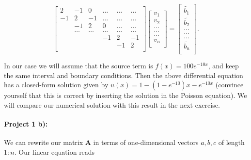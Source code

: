 \documentclass[%
oneside,                 %
final,                   %
10pt]{article}
\begin{document}
\[
     \begin{bmatrix}
                           2& -1 & 0 &\dots   & \dots &\dots \\
                           -1 & 2 & -1 &\dots &\dots &\dots \\
                           & -1 & 2 & 0 & \dots & \dots \\
                           & \dots   & \dots &\dots   &\dots & \dots \\
                           &   &  &-1  &2& -1 \\
                           &    &  &   &-1 & 2 \\
                      \end{bmatrix}\begin{bmatrix}
                           v_1\\
                           v_2\\
                           \dots \\
                          \dots  \\
                          \dots \\
                           v_n\\
                      \end{bmatrix}
  =\begin{bmatrix}
                          \tilde{ b_1}\\
                          \tilde{b_2}\\
                           \dots \\
                           \dots \\
                          \dots \\
                           \tilde{b_n}\\
                      \end{bmatrix}.
\]


In our case we will assume  that the source term is 
$f(x) = 100e^{-10x}$, and keep the same interval and boundary 
conditions. Then the above differential equation
has a closed-form  solution given by $u(x) = 1-(1-e^{-10})x-e^{-10x}$ (convince yourself that this is correct by inserting the
solution in the Poisson equation).  We will compare
our numerical solution with this result in the next exercise. 

\paragraph{Project 1 b):}
We can rewrite our matrix $\mathbf{A}$ in terms of one-dimensional vectors $a,b,c$  
of length $1:n$. 
Our linear equation reads
\end{document}
